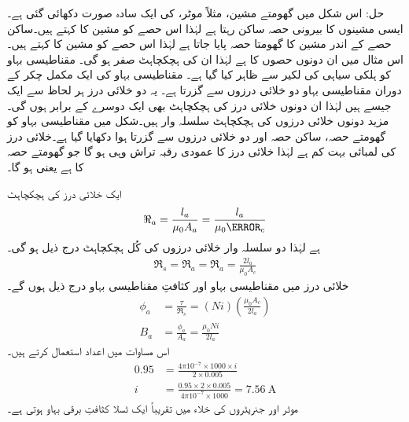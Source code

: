 حل:\quad
اس شکل میں گھومتے مشین، مثلاً موٹر، کی ایک سادہ صورت دکھائی گئی ہے۔ ایسی مشینوں کا بیرونی حصہ ساکن رہتا ہے لہٰذا اس حصے  کو مشین کا  کہتے ہیں۔ساکن حصے کے اندر مشین کا  گھومتا حصہ پایا جاتا ہے لہٰذا اس حصے کو مشین کا  کہتے ہیں۔ اس مثال میں ان دونوں حصوں کا    ہے لہٰذا ان کی ہچکچاہٹ صفر ہو گی۔ مقناطیسی بہاو  کو ہلکی سیاہی کی لکیر سے ظاہر کیا گیا ہے۔ مقناطیسی بہاو کی ایک مکمل چکر کے دوران مقناطیسی بہاو دو خلائی درزوں  سے گزرتا ہے۔ یہ دو خلائی درز ہر لحاظ سے ایک جیسے ہیں لہٰذا ان دونوں خلائی درز کی ہچکچاہٹ بھی ایک دوسرے کے برابر ہوں گی۔مزید دونوں خلائی درزوں کی ہچکچاہٹ سلسلہ وار ہیں۔شکل  میں مقناطیسی بہاو کو گھومتے حصہ، ساکن حصہ اور دو خلائی درزوں  سے گزرتا ہوا دکھایا گیا ہے۔خلائی درز کی لمبائی  بہت کم ہے لہٰذا خلائی درز کا عمودی رقبہ تراش  وہی ہو گا جو گھومتے حصہ کا ہے یعنی  ہو گا۔

ایک خلائی درز کی ہچکچاہٹ
\begin{align*}
\Re_a=\frac{l_a}{\mu_0 A_a}=\frac{l_a}{\mu_0 \A_c}
\end{align*}
ہے لہٰذا دو سلسلہ وار خلائی درزوں کی کُل ہچکچاہٹ درج ذیل ہو گی۔
\begin{align*}
\Re_s=\Re_a=\Re_a=\frac{2 l_a}{\mu_0 A_c}
\end{align*}
خلائی درز میں مقناطیسی بہاو  اور کثافتِ مقناطیسی بہاو  درج ذیل ہوں گے۔
\begin{align*}
\phi_a&=\frac{\tau}{\Re_s}=\left(N i \right) \left (\frac{\mu_0 A_c}{2 l_a} \right)\\
B_a&=\frac{\phi_a}{A_a}=\frac{\mu_0 N i}{2 l_a}
\end{align*}
اس مساوات میں اعداد استعمال کرتے ہیں۔
\begin{align*}
0.95&=\frac{4 \pi 10^{-7} \times 1000 \times i}{2 \times 0.005}\\
i&=\frac{0.95 \times 2 \times 0.005}{ 4 \pi 10^{-7} \times 1000}=\SI{7.56}{\ampere}
\end{align*}
موٹر اور جنریٹروں کی خلاء میں تقریباً ایک ٹسلا کثافتِ برقی بہاو ہوتی ہے۔

